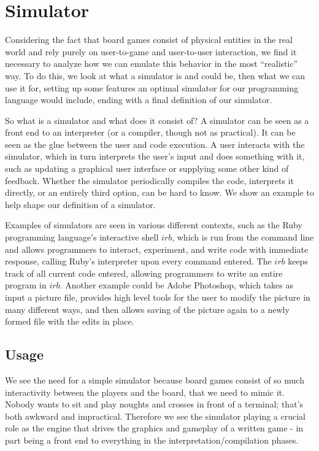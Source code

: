 \section{Simulator} Considering the fact that board games consist of
physical entities in the real world and rely purely on user-to-game
and user-to-user interaction, we find it necessary to analyze how we
can emulate this behavior in the most ``realistic'' way. To do this,
we look at what a simulator is and could be, then what we can use it
for, setting up some features an optimal simulator for our programming
language would include, ending with a final definition of our simulator.

So what is a simulator and what does it consist of? A simulator can
be seen as a front end to an interpreter (or a compiler, though not
as practical). It can be seen as the glue between the user and code
execution. A user interacts with the simulator, which in turn interprets
the user's input and does something with it, such as updating a
graphical user interface or supplying some other kind of feedback.
Whether the simulator periodically compiles the code, interprets it
directly, or an entirely third option, can be hard to know. We show an
example to help shape our definition of a simulator.

Examples of simulators are seen in various different contexts, such as
the Ruby\cite{rubyLang} programming language's interactive shell $irb$,
which is run from the command line and allows programmers to interact,
experiment, and write code with immediate response, calling Ruby's
interpreter upon every command entered. The $irb$ keeps track of all
current code entered, allowing programmers to write an entire program in
$irb$. Another example could be Adobe\textsuperscript{\textregistered}
Photoshop\textsuperscript{\textregistered}, which takes as input a
picture file, provides high level tools for the user to modify the
picture in many different ways, and then allows saving of the picture
again to a newly formed file with the edits in place.

\subsection{Usage} We see the need for a simple simulator because board
games consist of so much interactivity between the players and the
board, that we need to mimic it. Nobody wants to sit and play noughts
and crosses in front of a terminal; that's both awkward and impractical.
Therefore we see the simulator playing a crucial role as the engine that
drives the graphics and gameplay of a written game - in part being a
front end to everything in the interpretation/compilation phases.

